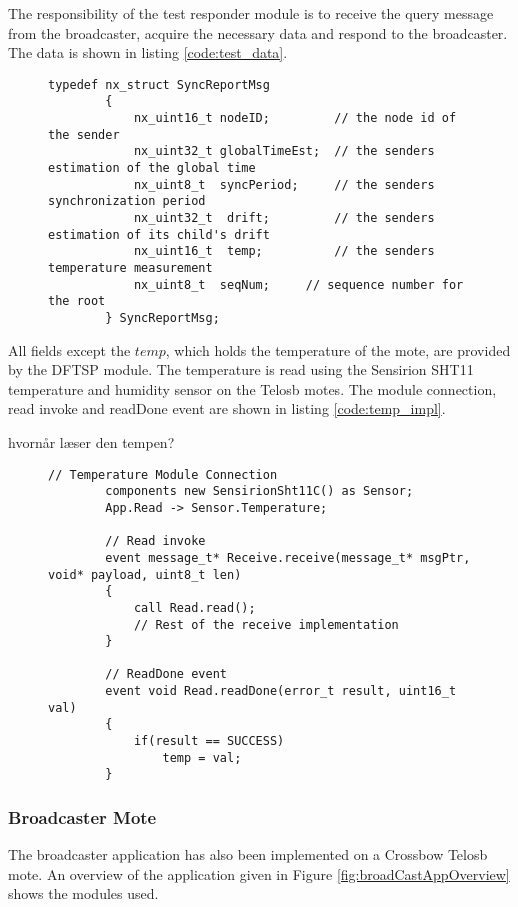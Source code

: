 \documentclass[Main]{subfiles}
\begin{document}
				The responsibility of the test responder module is to receive the query message from the broadcaster, acquire the necessary data and respond to the broadcaster.
				The data is shown in listing \ref{code:test_data}.

				\begin{figure}[H]
					\begin{lstlisting}[caption=DFTSP Test Data, style=Code-C, label=code:test_data]
		typedef nx_struct SyncReportMsg
		{
			nx_uint16_t	nodeID;			// the node id of the sender
			nx_uint32_t	globalTimeEst;	// the senders estimation of the global time
			nx_uint8_t  syncPeriod;		// the senders synchronization period
			nx_uint32_t  drift;			// the senders estimation of its child's drift
			nx_uint16_t  temp;			// the senders temperature measurement
			nx_uint8_t	seqNum;		// sequence number for the root
		} SyncReportMsg;

					\end{lstlisting}
				\end{figure}

				All fields except the $temp$, which holds the temperature of the mote, are provided by the DFTSP module.
				The temperature is read using the Sensirion SHT11\cite{tempSensorDatasheet} temperature and humidity sensor on the Telosb motes.
				The module connection, read invoke and readDone event are shown in listing \ref{code:temp_impl}.

				hvornår læser den tempen?

				\begin{figure}[H]
					\begin{lstlisting}[caption=Temperature reading implementation, style=Code-C, label=code:temp_impl]
		// Temperature Module Connection
		components new SensirionSht11C() as Sensor;
		App.Read -> Sensor.Temperature;

		// Read invoke
		event message_t* Receive.receive(message_t* msgPtr, void* payload, uint8_t len)
		{
	    	call Read.read();
	    	// Rest of the receive implementation
		}

		// ReadDone event
		event void Read.readDone(error_t result, uint16_t val)
		{
			if(result == SUCCESS)
				temp = val;
		}

						\end{lstlisting}
				\end{figure}
		
		
		\subsubsection{Broadcaster Mote} %
		\label{sub:broadcaster_mote}
			The broadcaster application has also been implemented on a Crossbow Telosb mote. 
			An overview of the application given in Figure \ref{fig:broadCastAppOverview} shows the modules used. 
\end{document}
